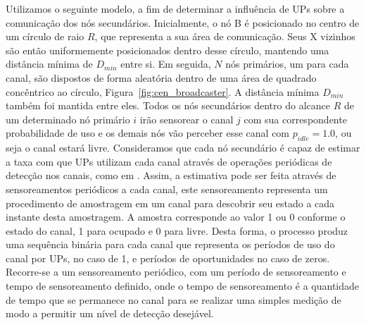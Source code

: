 
Utilizamos o seguinte modelo, a fim de determinar a influência de UPs sobre a comunicação dos nós secundários. Inicialmente, o nó B é posicionado no centro de um círculo de raio $R$, que representa a sua área de comunicação. Seus X vizinhos são então uniformemente posicionados dentro desse círculo, mantendo uma distância mínima de $D_{min}$ entre si. Em seguida, $N$ nós primários, um para cada canal, são dispostos de forma aleatória dentro de uma área de quadrado concêntrico ao círculo, Figura~\ref{fig:cen_broadcaster}. A distância mínima $D_{min}$ também foi mantida entre eles. Todos os nós secundários dentro do alcance $R$ de um determinado nó primário $i$ irão sensorear o canal $j$ com sua correspondente probabilidade de uso e os demais nós vão perceber esse canal com $p_{idle} = 1.0$, ou seja o canal estará livre. Consideramos que cada nó secundário é capaz de estimar a taxa com que UPs utilizam cada canal através de operações periódicas de detecção nos canais, como em \cite{kim08}. Assim, a estimativa pode ser feita através de sensoreamentos periódicos a cada canal, este sensoreamento representa um procedimento de amostragem em um canal para descobrir seu estado a cada instante desta amostragem. A amostra corresponde ao valor 1 ou 0 conforme o estado do canal, 1 para ocupado e 0 para livre. Desta forma, o processo produz uma sequência binária para cada canal que representa os períodos de uso do canal por UPs, no caso de 1, e períodos de oportunidades no caso de zeros. Recorre-se a um sensoreamento periódico, com um período de sensoreamento e tempo de sensoreamento definido, onde o tempo de sensoreamento é a quantidade de tempo que se permanece no canal para se realizar uma simples medição de modo a permitir um nível de detecção desejável.   


